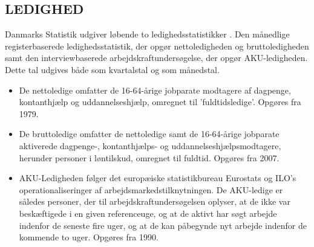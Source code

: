 \subsection{LEDIGHED \label{}}

Danmarks Statistik udgiver løbende to ledighedsstatistikker \parencite{DST2014}. Den månedlige registerbaserede ledighedsstatistik, der opgør nettoledigheden og bruttoledigheden samt den interviewbaserede arbejdskraftundersøgelse, der opgør AKU-ledigheden. Dette tal udgives både som kvartalstal og som månedstal.
\begin{itemize} [topsep=6pt,itemsep=-1ex]
  \item De nettoledige omfatter de 16-64-årige jobparate modtagere af dagpenge, kontanthjælp og uddannelseshjælp, omregnet til ’fuldtidsledige’. Opgøres fra 1979.
  \item De bruttoledige omfatter de nettoledige samt de 16-64-årige jobparate aktiverede dagpenge-, kontanthjælps- og uddannelseshjælpsmodtagere, herunder personer i løntilskud, omregnet til fuldtid. Opgøres fra 2007.
  \item AKU-Ledigheden følger det europæiske statistikbureau Eurostats og ILO’s operationaliseringer af arbejdsmarkedstilknytningen. De AKU-ledige er således personer, der til arbejdskraftundersøgelsen oplyser, at de ikke var beskæftigede i en given referenceuge, og at de aktivt har søgt arbejde indenfor de seneste fire uger, og at de kan påbegynde nyt arbejde indenfor de kommende to uger. Opgøres fra 1990.
\end{itemize}

